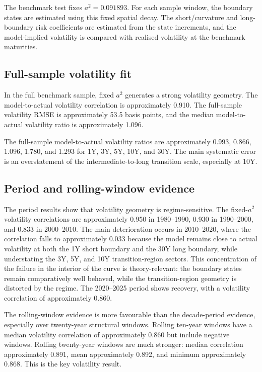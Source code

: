 \documentclass[11pt]{article}
\begin{document}
The benchmark test fixes $a^2=0.091893$. For each sample window, the boundary states are estimated using this fixed spatial decay. The short/curvature and long-boundary risk coefficients are estimated from the state increments, and the model-implied volatility is compared with realised volatility at the benchmark maturities.

\subsection{Full-sample volatility fit}

In the full benchmark sample, fixed $a^2$ generates a strong volatility geometry. The model-to-actual volatility correlation is approximately 0.910. The full-sample volatility RMSE is approximately 53.5 basis points, and the median model-to-actual volatility ratio is approximately 1.096.

The full-sample model-to-actual volatility ratios are approximately 0.993, 0.866, 1.096, 1.780, and 1.293 for 1Y, 3Y, 5Y, 10Y, and 30Y. The main systematic error is an overstatement of the intermediate-to-long transition scale, especially at 10Y.

\subsection{Period and rolling-window evidence}

The period results show that volatility geometry is regime-sensitive. The fixed-$a^2$ volatility correlations are approximately 0.950 in 1980--1990, 0.930 in 1990--2000, and 0.833 in 2000--2010. The main deterioration occurs in 2010--2020, where the correlation falls to approximately 0.033 because the model remains close to actual volatility at both the 1Y short boundary and the 30Y long boundary, while understating the 3Y, 5Y, and 10Y transition-region sectors. This concentration of the failure in the interior of the curve is theory-relevant: the boundary states remain comparatively well behaved, while the transition-region geometry is distorted by the regime. The 2020--2025 period shows recovery, with a volatility correlation of approximately 0.860.

The rolling-window evidence is more favourable than the decade-period evidence, especially over twenty-year structural windows. Rolling ten-year windows have a median volatility correlation of approximately 0.860 but include negative windows. Rolling twenty-year windows are much stronger: median correlation approximately 0.891, mean approximately 0.892, and minimum approximately 0.868. This is the key volatility result.
\end{document}
